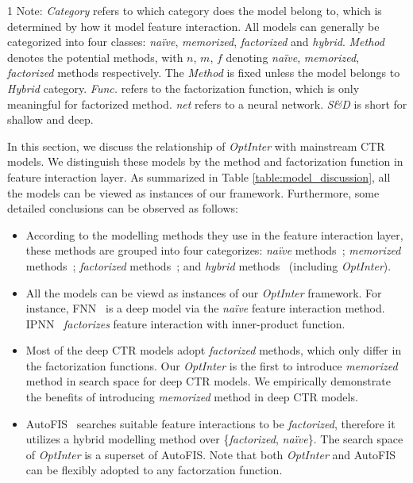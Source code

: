 \documentclass[conference]{IEEEtran}
\begin{document}
\begin{table}[!htbp]
\begin{tablenotes}
    \footnotesize
    \item[1] Note: \textit{Category} refers to which category does the model belong to, which is determined by how it model feature interaction. All models can generally be categorized into four classes: \emph{naïve}, \emph{memorized}, \emph{factorized} and \emph{hybrid}. \textit{Method} denotes the potential methods, with $n$, $m$, $f$ denoting \emph{naïve}, \emph{memorized}, \emph{factorized} methods respectively. The \textit{Method} is fixed unless the model belongs to \emph{Hybrid} category. \textit{Func.} refers to the factorization function, which is only meaningful for factorized method. \textit{net} refers to a neural network. \textit{S\&D} is short for shallow and deep.
    \end{tablenotes}
    \label{table:model_discussion}
\end{table}


In this section, we discuss the relationship of \textit{OptInter} with mainstream CTR models. We distinguish these models by the method and factorization function in feature interaction layer. As summarized in Table \ref{table:model_discussion}, all the models can be viewed as instances of our framework. Furthermore, some detailed conclusions can be observed as follows:
\begin{itemize}
    \item According to the modelling methods they use in the feature interaction layer, these methods are grouped into four categorizes: \emph{naïve} methods~\cite{LR,FNN}; \emph{memorized} methods~\cite{Poly-2,Wide_Deep}; \emph{factorized} methods~\cite{FM,FwFM,FM2,PNN16,PNN19,DeepFM}; and \emph{hybrid} methods~\cite{AutoFis} (including \textit{OptInter}).
     \item All the models can be viewd as instances of our \textit{OptInter} framework. For instance, FNN~\cite{FNN} is a deep model via the \emph{naïve} feature interaction method. IPNN~\cite{PNN16} \emph{factorizes} feature interaction with inner-product function.
    \item Most of the deep CTR models adopt \emph{factorized} methods, which only differ in the factorization functions. Our \textit{OptInter} is the first to introduce \emph{memorized} method in search space for deep CTR models. We empirically demonstrate the benefits of introducing \emph{memorized} method in deep CTR models.
    \item AutoFIS~\cite{AutoFis} searches suitable feature interactions to be \emph{factorized}, therefore it utilizes a hybrid modelling method over \{\emph{factorized}, \emph{naïve}\}. 
    The search space of \textit{OptInter} is a superset of AutoFIS. Note that both \textit{OptInter} and AutoFIS can be flexibly adopted to any factorzation function.
\end{itemize}
\end{document}
